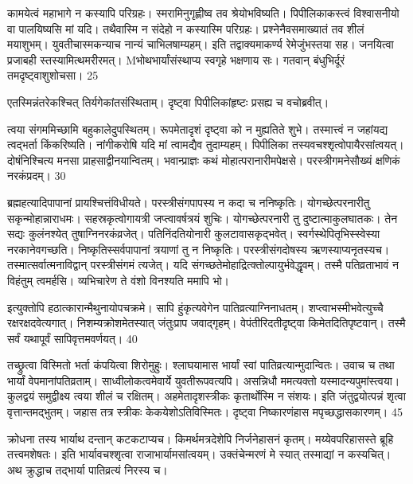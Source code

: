 कामयेत्वं महाभागे न कस्यापि परिग्रहः।
स्मरामिनुगृह्णीष्व तव श्रेयोभविष्यति।
पिपीलिकाकस्त्वं विश्वासनीयो वा पालयिष्यसि मां यदि।
तथैवास्मि न संदेहो न कस्यास्मि परिग्रहः।
प्रश्नेनैवसमाख्यातं तव शीलं मयाशुभम्।
युवतीचास्मकन्याच नान्यं चाभिलषाम्यहम्।
इति तद्वाक्यमाकर्ण्य रेमेजुंभस्तया सह।
जनयित्वा प्रजाबही स्तस्यामित्थमरीरमत्।
Mभोथभार्यांसंस्थाप्य स्वगृहे भक्षणाय सः।
गतवान् बंधुभिर्दूरं तमदृष्ट्वाशुशोचसा।
25

एतस्मिन्नंतरेकश्चित् तिर्यगेकांतसंस्थिताम्।
दृष्ट्वा पिपीलिकांहृष्टः प्रसह्य च वचोब्रवीत्।

त्वया संगममिच्छामि बहुकालेदुपस्थितम्।
रूपमेतादृशं दृष्ट्वा को न मुह्यतिते शुभे।
तस्मात्त्वं न जहांयद्य त्वद्भर्ता किंकरिष्यति।
नांगीकरोषि यदि मां त्वामद्यैव तुदाम्यहम्।
पिपीलिका तस्यवचश्शृत्वोपायैरसांत्वयत्।
दोषंनिश्चित्य मनसा प्राहसाद्वीनयान्वितम्।
भवान्प्राज्ञः कथं मोहात्परानारीमपेक्षसे।
परस्त्रीगमनेसौख्यं क्षणिकं नरकंप्रदम्।
30

ब्रह्महत्यादिपापानां प्रायश्चित्तंविधीयते।
परस्त्रीसंगपापस्य न कदा च ननिष्कृतिः।
योगच्छेत्परनारीतु सकृन्मोहान्नाराधमः।
सहस्रकृत्वोगायत्री जप्त्वावर्षत्रयं शुचिः।
योगच्छेत्परनारी तु दुष्टात्माकुलघातकः।
तेन सद्यः कुलंनश्येत् तुषाग्निनरकंव्रजेत्।
पतिनिंदतियोनारी कुलटावासकृद्भवेत्।
स्वर्गस्थेपितृभिस्स्वेस्या नरकानेवगच्छति।
निष्कृतिस्सर्वपापानां त्रयाणां तु न निष्कृतिः।
परस्त्रीसंगदोषस्य ऋणस्याप्यनृतस्यच।
तस्मात्सर्वात्मनाविद्वान् परस्त्रीसंगमं त्यजेत्।
यदि संगच्छतेमोहाद्रित्क्तोल्पायुर्भवेद्धृवम्।
तस्मै पतिव्रताभावं न विहंतुम् त्वमर्हसि।
व्यभिचारेण ते वंशो विनश्यति ममापि भो।

इत्युक्तोपि हठात्कारान्मैथुनायोपचक्रमे।
सापि हुंकृत्यवेगेन पातिव्रत्याग्निनाधतम्।
शप्त्वाभस्मीभवेत्युच्चै रक्षरक्षदवेत्यगात्।
निशम्यक्रोशमेतस्यात् जंतुःप्राप जवाद्गृहम्।
वेपंतीरिदतीदृष्ट्वा किमेतदितिपृष्टवान्।
तस्मै सर्वं यथापूर्वं सापिवृत्तमवर्णयत्।
40

तच्छ्रुत्वा विस्मितो भर्ता कंपयित्वा शिरोमुहुः।
श्लाघयामास भार्यां स्वां पातिव्रत्यान्मुदान्वितः।
उवाच च तथा भार्यां वेपमानांपतिव्रताम्।
साध्वीलोकत्वमेवार्ये युवतीरूपवत्यपि।
असन्निधौ ममत्यक्तो यस्मादन्यपुमांस्त्वया।
कुलद्वयं समुद्वीक्ष्य त्वया शीलं च रक्षितम्।
अहमेतादृशस्त्रीकः कृतार्थोस्मि न संशयः।
इति जंतुद्वयोत्पन्नं शृत्वा वृत्तान्तमद्भुतम्।
जहास तत्र स्त्रीकः केकयेशोऽतिविस्मितः।
दृष्ट्वा निष्कारणंहास मपृच्छद्धासकारणम्।
45

क्रोधना तस्य भार्याथ दन्तान् कटकटाप्यच।
किमर्थमत्रदेशेपि निर्जनेहासनं कृतम्।
मय्येवपरिहासस्ते ब्रूहि तत्त्वमशेषतः।
इति भार्यावचश्शृत्वा राजाभार्यामसांत्वयम्।
उक्तंचेन्मरणं मे स्यात् तस्माद्यां न कस्यचित्।
अथ क्रुद्धाच तद्भार्या पातिव्रत्यं निरस्य च।

